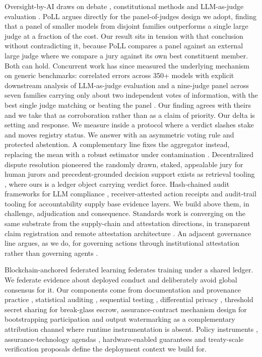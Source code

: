 \documentclass[conference]{IEEEtran}
\begin{document}
Oversight-by-AI draws on debate \cite{r10}, constitutional methods \cite{r11} and LLM-as-judge evaluation \cite{r12}. PoLL \cite{r38} argues directly for the panel-of-judges design we adopt, finding that a panel of smaller models from disjoint families outperforms a single large judge at a fraction of the cost. Our result sits in tension with that conclusion without contradicting it, because PoLL compares a panel against an external large judge where we compare a jury against its own best constituent member. Both can hold. Concurrent work has since measured the underlying mechanism on generic benchmarks: correlated errors across 350+ models with explicit downstream analysis of LLM-as-judge evaluation \cite{r39} and a nine-judge panel across seven families carrying only about two independent votes of information, with the best single judge matching or beating the panel \cite{r40}. Our finding agrees with theirs and we take that as corroboration rather than as a claim of priority. Our delta is setting and response. We measure inside a protocol where a verdict slashes stake and moves registry status. We answer with an asymmetric voting rule and protected abstention. A complementary line fixes the aggregator instead, replacing the mean with a robust estimator under contamination \cite{r41}. Decentralized dispute resolution pioneered the randomly drawn, staked, appealable jury for human jurors \cite{r31} and precedent-grounded decision support exists as retrieval tooling \cite{r32}, where ours is a ledger object carrying verdict force. Hash-chained audit frameworks for LLM compliance \cite{r33}, receiver-attested action receipts \cite{r34} and audit-trail tooling for accountability \cite{r42} supply base evidence layers. We build above them, in challenge, adjudication and consequence. Standards work is converging on the same substrate from the supply-chain and attestation directions, in transparent claim registration \cite{r43} and remote attestation architecture \cite{r44}. An adjacent governance line argues, as we do, for governing actions through institutional attestation rather than governing agents \cite{r45}.

Blockchain-anchored federated learning \cite{r16,r17,r20} federates training under a shared ledger. We federate evidence about deployed conduct and deliberately avoid global consensus for it. Our components come from documentation and provenance practice \cite{r13,r14,r15}, statistical auditing \cite{r24}, sequential testing \cite{r25}, differential privacy \cite{r26}, threshold secret sharing \cite{r30} for break-glass escrow, assurance-contract mechanism design \cite{r27} for bootstrapping participation and output watermarking \cite{r28} as a complementary attribution channel where runtime instrumentation is absent. Policy instruments \cite{r18,r19}, assurance-technology agendas \cite{r35}, hardware-enabled guarantees \cite{r36} and treaty-scale verification proposals \cite{r37} define the deployment context we build for.
\end{document}
